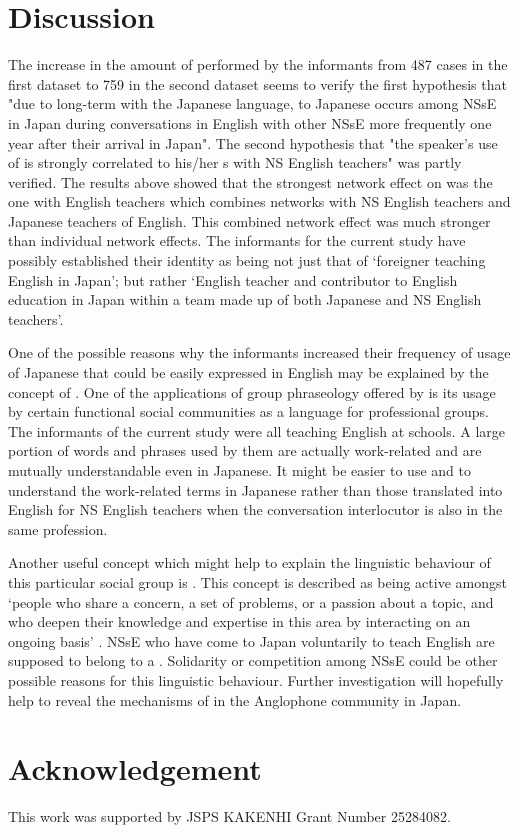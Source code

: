 \documentclass[output=paper]{LSP/langsci}
\begin{document}
\section{Discussion}
The increase in the amount of  performed by the informants from 487 cases in the first dataset to 759 in the second dataset seems to verify the first hypothesis that "due to long-term  with the Japanese language,  to Japanese occurs among NSsE in Japan during conversations in English with other NSsE more frequently one year after their arrival in Japan". The second hypothesis that "the speaker’s use of  is strongly correlated to his/her s with NS English teachers" was partly verified. The results above showed that the strongest network effect on  was the one with English teachers which combines networks with NS English teachers and Japanese teachers of English. This combined network effect was much stronger than individual network effects. The informants for the current study have possibly established their identity as being not just that of `foreigner teaching English in Japan'; but rather `English teacher and contributor to English education in Japan within a team made up of both Japanese and NS English teachers'.

One of the possible reasons why the informants increased their frequency of usage of Japanese that could be easily expressed in English may be explained by the concept of . One of the applications of group phraseology offered by \citet[8]{yonekawa_shudango_2009} is its usage by certain functional social communities as a language for professional groups. The informants of the current study were all teaching English at schools. A large portion of words and phrases used by them are actually work-related and are mutually understandable even in Japanese. It might be easier to use and to understand the work-related terms in Japanese rather than those translated into English for NS English teachers when the conversation interlocutor is also in the same profession.

Another useful concept which might help to explain the linguistic behaviour of this particular social group is  \citep{eckert_adolescent_1988}. This concept is described as being active amongst ‘people who share a concern, a set of problems, or a passion about a topic, and who deepen their knowledge and expertise in this area by interacting on an ongoing basis’ \citep[4]{wenger_cultivating_2002}. NSsE who have come to Japan voluntarily to teach English are supposed to belong to a . Solidarity or competition among NSsE could be other possible reasons for this linguistic behaviour. Further investigation will hopefully help to reveal the mechanisms of  in the Anglophone community in Japan.

\section*{Acknowledgement}
This work was supported by JSPS KAKENHI Grant Number 25284082.

\printbibliography[heading=subbibliography,notkeyword=this]
\end{document}
